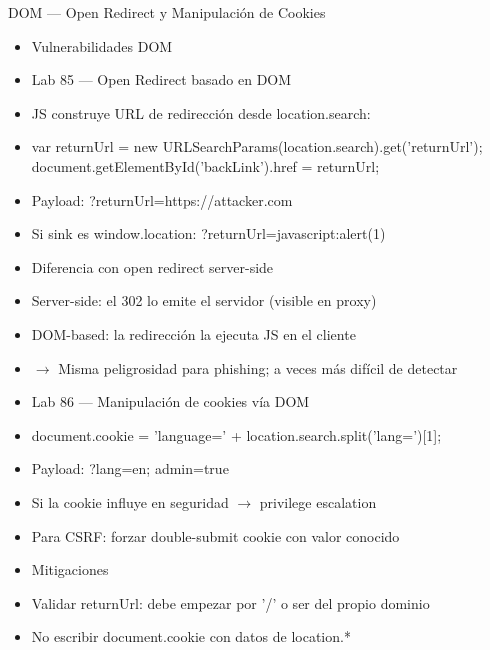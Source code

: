 \documentclass[aspectratio=169,10pt]{beamer}
\newcommand{\cmdbox}[1]{%
  \begin{center}%
  {\setlength{\fboxsep}{6pt}\colorbox{uzlav!40}{\parbox{0.88\linewidth}{\ttfamily\footnotesize #1}}}%
  \end{center}}
\begin{document}
\begin{frame}[allowframebreaks]{DOM --- Open Redirect y Manipulación de Cookies}
\small
  \begin{itemize}
  \item Vulnerabilidades DOM
  \item Lab 85 --- Open Redirect basado en DOM
  \item JS construye URL de redirección desde location.search:
  \item[] \cmdbox{var returnUrl = new URLSearchParams(location.search).get('returnUrl');\\{}
document.getElementById('backLink').href = returnUrl;}
  \item Payload: ?returnUrl=https://attacker.com
  \item Si sink es window.location: ?returnUrl=javascript:alert(1)
  \item Diferencia con open redirect server-side
  \item Server-side: el 302 lo emite el servidor (visible en proxy)
  \item DOM-based: la redirección la ejecuta JS en el cliente
  \item $\rightarrow$ Misma peligrosidad para phishing; a veces más difícil de detectar
  \item Lab 86 --- Manipulación de cookies vía DOM
  \item[] \cmdbox{document.cookie = 'language=' + location.search.split('lang=')[1];}
  \item Payload: ?lang=en; admin=true
  \item Si la cookie influye en seguridad $\rightarrow$ privilege escalation
  \item Para CSRF: forzar double-submit cookie con valor conocido
  \item Mitigaciones
  \item Validar returnUrl: debe empezar por '/' o ser del propio dominio
  \item No escribir document.cookie con datos de location.*
  \end{itemize}
\end{frame}
\end{document}
